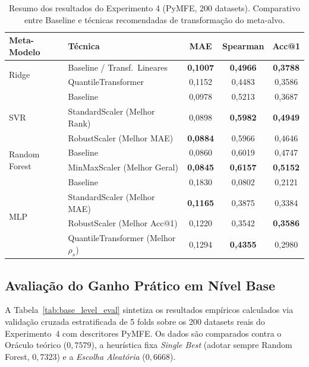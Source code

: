 \documentclass[12pt]{article}
\begin{document}
\begin{table}[ht]
\centering
\caption{Resumo dos resultados do Experimento 4 (PyMFE, 200 datasets). Comparativo entre Baseline e técnicas recomendadas de transformação do meta-alvo.}
\label{tab:results_exp4_summary}
\small
\begin{tabular}{llccc}
\toprule
\textbf{Meta-Modelo} & \textbf{Técnica} & \textbf{MAE} & \textbf{Spearman} & \textbf{Acc@1} \\
\midrule
\multirow{2}{*}{Ridge}
 & Baseline / Transf.\ Lineares & \textbf{0,1007} & \textbf{0,4966} & \textbf{0,3788} \\
 & QuantileTransformer         & 0,1152          & 0,4483          & 0,3586          \\
\midrule
\multirow{3}{*}{SVR}
 & Baseline                    & 0,0978          & 0,5213          & 0,3687          \\
 & StandardScaler (Melhor Rank)& 0,0898          & \textbf{0,5982} & \textbf{0,4949} \\
 & RobustScaler (Melhor MAE)   & \textbf{0,0884} & 0,5966          & 0,4646          \\
\midrule
\multirow{2}{*}{Random Forest}
 & Baseline                    & 0,0860          & 0,6019          & 0,4747          \\
 & MinMaxScaler (Melhor Geral) & \textbf{0,0845} & \textbf{0,6157} & \textbf{0,5152} \\
\midrule
\multirow{4}{*}{MLP}
 & Baseline                    & 0,1830          & 0,0802          & 0,2121          \\
 & StandardScaler (Melhor MAE) & \textbf{0,1165} & 0,3875          & 0,3384          \\
 & RobustScaler (Melhor Acc@1) & 0,1220          & 0,3542          & \textbf{0,3586} \\
 & QuantileTransformer (Melhor $\rho_s$) & 0,1294 & \textbf{0,4355} & 0,2980          \\
\bottomrule
\end{tabular}
\end{table}

\subsection{Avaliação do Ganho Prático em Nível Base}
\label{subsec:nivel_base}

A Tabela~\ref{tab:base_level_eval} sintetiza os resultados empíricos calculados via validação cruzada estratificada de 5 folds sobre os 200 datasets reais do Experimento~4 com descritores PyMFE. Os dados são comparados contra o Oráculo teórico ($0{,}7579$), a heurística fixa \textit{Single Best} (adotar sempre Random Forest, $0{,}7323$) e a \textit{Escolha Aleatória} ($0{,}6668$).
\end{document}
